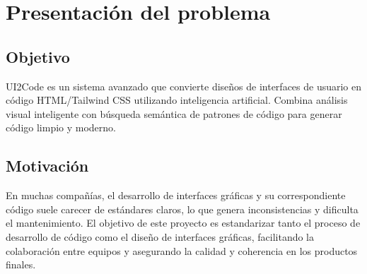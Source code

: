 \section{Presentación del problema}

\subsection{Objetivo}
UI2Code es un sistema avanzado que convierte diseños de interfaces de usuario en código HTML/Tailwind CSS utilizando inteligencia artificial. Combina análisis visual inteligente con búsqueda semántica de patrones de código para generar código limpio y moderno.


\subsection{Motivación}
En muchas compañías, el desarrollo de interfaces gráficas y su correspondiente código suele carecer de estándares claros, lo que genera inconsistencias y dificulta el mantenimiento. El objetivo de este proyecto es estandarizar tanto el proceso de desarrollo de código como el diseño de interfaces gráficas, facilitando la colaboración entre equipos y asegurando la calidad y coherencia en los productos finales.
